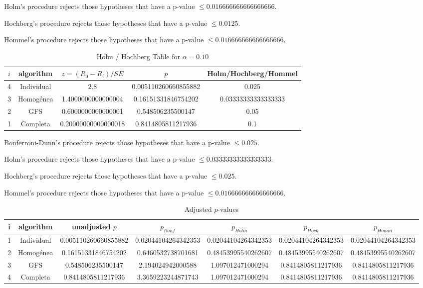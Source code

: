 \documentclass[a4paper,10pt]{article}
\begin{document}
\begin{landscape}
Holm's procedure rejects those hypotheses that have a p-value $\le0.016666666666666666$.


Hochberg's procedure rejects those hypotheses that have a p-value $\le0.0125$.


Hommel's procedure rejects those hypotheses that have a p-value $\le0.016666666666666666$.


\begin{table}[!htp]
\centering\tiny
\caption{Holm / Hochberg Table for $\alpha=0.10$}
\begin{tabular}{ccccc}
$i$&algorithm&$z=(R_0 - R_i)/SE$&$p$&Holm/Hochberg/Hommel\\
\hline
4&Individual&2.8&0.005110260660855882&0.025\\
3&Homogénea&1.4000000000000004&0.16151331846754202&0.03333333333333333\\
2&GFS&0.6000000000000001&0.548506235500147&0.05\\
1&Completa&0.20000000000000018&0.8414805811217936&0.1\\
\hline
\end{tabular}
\end{table}
Bonferroni-Dunn's procedure rejects those hypotheses that have a p-value $\le0.025$.


Holm's procedure rejects those hypotheses that have a p-value $\le0.03333333333333333$.


Hochberg's procedure rejects those hypotheses that have a p-value $\le0.025$.


Hommel's procedure rejects those hypotheses that have a p-value $\le0.016666666666666666$.


\begin{table}[!htp]
\centering\tiny
\caption{Adjusted $p$-values}
\begin{tabular}{ccccccc}
i&algorithm&unadjusted $p$&$p_{Bonf}$&$p_{Holm}$&$p_{Hoch}$&$p_{Homm}$\\
\hline
1&Individual&0.005110260660855882&0.02044104264342353&0.02044104264342353&0.02044104264342353&0.02044104264342353\\
2&Homogénea&0.16151331846754202&0.6460532738701681&0.48453995540262607&0.48453995540262607&0.48453995540262607\\
3&GFS&0.548506235500147&2.194024942000588&1.097012471000294&0.8414805811217936&0.8414805811217936\\
4&Completa&0.8414805811217936&3.3659223244871743&1.097012471000294&0.8414805811217936&0.8414805811217936\\
\hline
\end{tabular}
\end{table}


\end{landscape}
\end{document}
